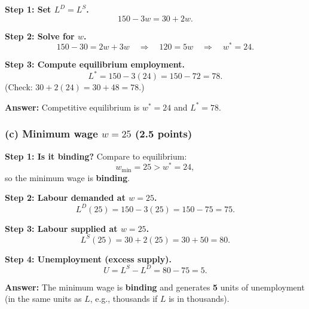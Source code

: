 \documentclass[11pt]{article}
\begin{document}
\textbf{Step 1: Set $L^D = L^S$.}
\[
150 - 3w = 30 + 2w.
\]

\textbf{Step 2: Solve for $w$.}
\[
150 - 30 = 2w + 3w
\quad \Rightarrow \quad
120 = 5w
\quad \Rightarrow \quad
w^* = 24.
\]

\textbf{Step 3: Compute equilibrium employment.}
\[
L^* = 150 - 3(24) = 150 - 72 = 78.
\]
(Check: $30 + 2(24) = 30 + 48 = 78$.)

\textbf{Answer:} Competitive equilibrium is \textbf{$w^* = 24$} and \textbf{$L^* = 78$}.

\subsubsection*{(c) Minimum wage $w = 25$ (2.5 points)}

\textbf{Step 1: Is it binding?} Compare to equilibrium:
\[
w_{\min} = 25 > w^* = 24,
\]
so the minimum wage is \textbf{binding}.

\textbf{Step 2: Labour demanded at $w=25$.}
\[
L^D(25) = 150 - 3(25) = 150 - 75 = 75.
\]

\textbf{Step 3: Labour supplied at $w=25$.}
\[
L^S(25) = 30 + 2(25) = 30 + 50 = 80.
\]

\textbf{Step 4: Unemployment (excess supply).}
\[
U = L^S - L^D = 80 - 75 = 5.
\]

\textbf{Answer:} The minimum wage is \textbf{binding} and generates \textbf{5} units of unemployment (in the same units as $L$, e.g., thousands if $L$ is in thousands).
\end{document}
